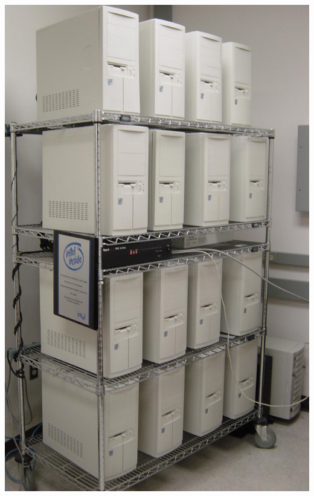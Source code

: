 \documentclass[compress,12pt]{beamer}
\begin{document}
\begin{frame}
{\begin{columns}
       { \centerline{\includegraphics[height=.8\textheight]{figures/bbrox_front}} }

\end{columns}}
\end{frame}
\end{document}
